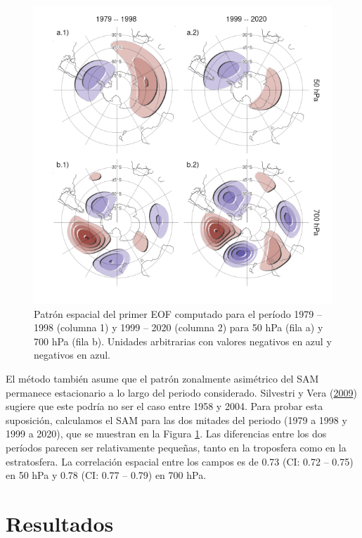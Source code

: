 \documentclass[12pt,oneside,a4paper]{reedthesis}
\begin{document}
\begin{figure}

{\centering \includegraphics{figures/30-sam/sam-period-1} 

}

\caption{Patrón espacial del primer EOF computado para el período 1979 -- 1998 (columna 1) y 1999 -- 2020 (columna 2) para 50 hPa (fila a) y 700 hPa (fila b). Unidades arbitrarias con valores negativos en azul y negativos en azul.}\label{fig:sam-period}
\end{figure}

El método también asume que el patrón zonalmente asimétrico del SAM permanece estacionario a lo largo del periodo considerado.
Silvestri y Vera (\protect\hyperlink{ref-silvestri2009}{2009}) sugiere que este podría no ser el caso entre 1958 y 2004.
Para probar esta suposición, calculamos el SAM para las dos mitades del periodo (1979 a 1998 y 1999 a 2020), que se muestran en la Figura \ref{fig:sam-period}.
Las diferencias entre los dos períodos parecen ser relativamente pequeñas, tanto en la troposfera como en la estratosfera.
La correlación espacial entre los campos es de 0.73 (CI: 0.72 -- 0.75) en 50 hPa y 0.78 (CI: 0.77 -- 0.79) en 700 hPa.

\hypertarget{resultados-2}{%
\section{Resultados}\label{resultados-2}}
\end{document}
